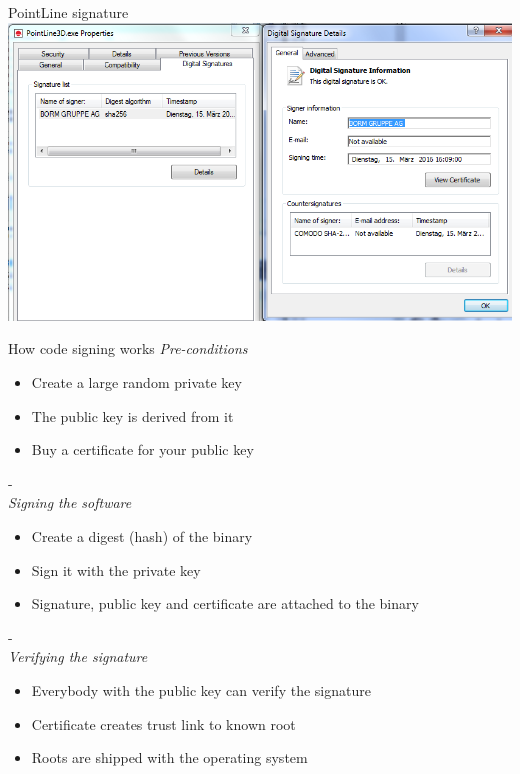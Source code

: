 \documentclass[11pt]{beamer}
\begin{document}
\begin{frame}{PointLine signature}
\includegraphics[scale=0.38]{pointLine_signature.png}
\end{frame}

\begin{frame}{How code signing works}
\emph{Pre-conditions}
\begin{itemize}
\item Create a large random private key
\item The public key is derived from it
\item Buy a certificate for your public key
\end{itemize}
\pause
-\\
\emph{Signing the software}
\begin{itemize}
\item Create a digest (hash) of the binary
\item Sign it with the private key
\item Signature, public key and certificate are attached to the binary
\end{itemize}
\pause
-\\
\emph{Verifying the signature}
\begin{itemize}
\item Everybody with the public key can verify the signature
\item Certificate creates trust link to known root
\item Roots are shipped with the operating system
\end{itemize}
\end{frame}
\end{document}
